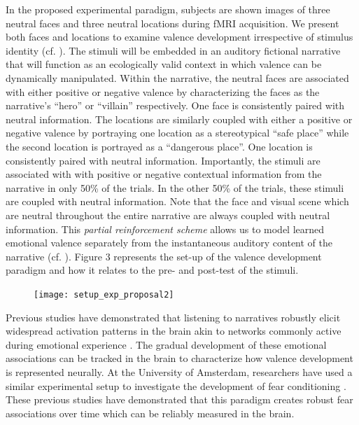 \documentclass[12pt,a4paper]{article}\usepackage[]{graphicx}\usepackage[]{color}
\begin{document}
In the proposed experimental paradigm, subjects are shown images of three neutral faces and three neutral locations during fMRI acquisition. We present both faces and locations to examine valence development irrespective of stimulus identity (cf. \citealp{britton2006}). The stimuli will be embedded in an auditory fictional narrative that will function as an ecologically valid context in which valence can be dynamically manipulated. Within the narrative, the neutral faces are associated with either positive or negative valence by characterizing the faces as the narrative's ``hero'' or ``villain'' respectively. One face is consistently paired with neutral information. The locations are similarly coupled with either a positive or negative valence by portraying one location as a stereotypical ``safe place'' while the second location is portrayed as a ``dangerous place''. One location is consistently paired with neutral information. Importantly, the stimuli are associated with with positive or negative contextual information from the narrative in only 50\% of the trials. In the other 50\% of the trials, these stimuli are coupled with neutral information. Note that the face and visual scene which are neutral throughout the entire narrative are always coupled with neutral information. This \emph{partial reinforcement scheme} allows us to model learned emotional valence separately from the instantaneous auditory content of the narrative (cf. \citealp{visser2013}). Figure 3 represents the set-up of the valence development paradigm and how it relates to the pre- and post-test of the stimuli.

\begin{figure}[h]
\centering
\texttt{[image: setup\_exp\_proposal2]}
\end{figure}

Previous studies have demonstrated that listening to narratives robustly elicit widespread
activation patterns in the brain \citep{nijhof2015,wallentin2011} akin to networks commonly active during emotional experience \citep{sabatinelli2006}. The gradual development of these emotional associations can be tracked in the brain to characterize how valence development is represented neurally. At the University of Amsterdam, researchers have used a similar experimental setup to investigate the development of fear conditioning \citep{visser2013,visser2011}. These previous studies have demonstrated that this paradigm creates robust fear associations over time which can be reliably measured in the brain.
\end{document}

